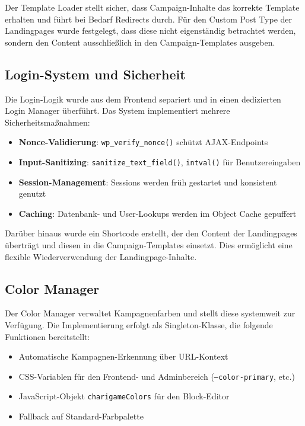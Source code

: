Der Template Loader stellt sicher, dass Campaign-Inhalte das korrekte Template erhalten und führt bei Bedarf Redirects durch.
Für den Custom Post Type der Landingpages wurde festgelegt, dass diese nicht eigenständig betrachtet werden, sondern den Content ausschließlich in den Campaign-Templates ausgeben.

\subsection{Login-System und Sicherheit}
Die Login-Logik wurde aus dem Frontend separiert und in einen dedizierten Login Manager überführt.
Das System implementiert mehrere Sicherheitsmaßnahmen:

\begin{itemize}
    \item \textbf{Nonce-Validierung}: \texttt{wp\_verify\_nonce()} schützt AJAX-Endpoints
    \item \textbf{Input-Sanitizing}: \texttt{sanitize\_text\_field()}, \texttt{intval()} für Benutzereingaben
    \item \textbf{Session-Management}: Sessions werden früh gestartet und konsistent genutzt
    \item \textbf{Caching}: Datenbank- und User-Lookups werden im Object Cache gepuffert
\end{itemize}

Darüber hinaus wurde ein Shortcode erstellt, der den Content der Landingpages überträgt und diesen in die Campaign-Templates einsetzt.
Dies ermöglicht eine flexible Wiederverwendung der Landingpage-Inhalte.

\subsection{Color Manager}
Der Color Manager verwaltet Kampagnenfarben und stellt diese systemweit zur Verfügung.
Die Implementierung erfolgt als Singleton-Klasse, die folgende Funktionen bereitstellt:

\begin{itemize}
    \item Automatische Kampagnen-Erkennung über URL-Kontext
    \item CSS-Variablen für den Frontend- und Adminbereich (\texttt{--color-primary}, etc.)
    \item JavaScript-Objekt \texttt{charigameColors} für den Block-Editor
    \item Fallback auf Standard-Farbpalette
\end{itemize}

